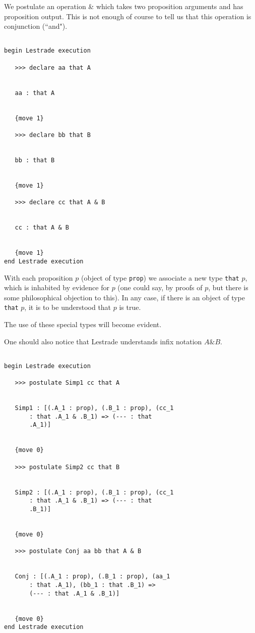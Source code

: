 \documentclass[12pt]{article}
\begin{document}
We postulate an operation \& which takes two proposition arguments and has proposition output.  This is not enough of course to tell us that this operation is conjunction (``and").

\begin{verbatim}

begin Lestrade execution

   >>> declare aa that A


   aa : that A


   {move 1}

   >>> declare bb that B


   bb : that B


   {move 1}

   >>> declare cc that A & B


   cc : that A & B


   {move 1}
end Lestrade execution

\end{verbatim}

With each proposition $p$ (object of type {\tt prop}) we associate a new type {\tt that} $p$, which is inhabited by evidence for $p$ (one could say, by proofs of $p$, but there is some philosophical objection to this).  In any case, if there is
an object of type {\tt that} $p$, it is to be understood that $p$ is true.

The use of these special types will become evident.

One should also notice that Lestrade understands infix notation $A \& B$.

\newpage

\begin{verbatim}

begin Lestrade execution

   >>> postulate Simp1 cc that A


   Simp1 : [(.A_1 : prop), (.B_1 : prop), (cc_1 
       : that .A_1 & .B_1) => (--- : that 
       .A_1)]


   {move 0}

   >>> postulate Simp2 cc that B


   Simp2 : [(.A_1 : prop), (.B_1 : prop), (cc_1 
       : that .A_1 & .B_1) => (--- : that 
       .B_1)]


   {move 0}

   >>> postulate Conj aa bb that A & B


   Conj : [(.A_1 : prop), (.B_1 : prop), (aa_1 
       : that .A_1), (bb_1 : that .B_1) => 
       (--- : that .A_1 & .B_1)]


   {move 0}
end Lestrade execution

\end{verbatim}
\end{document}
